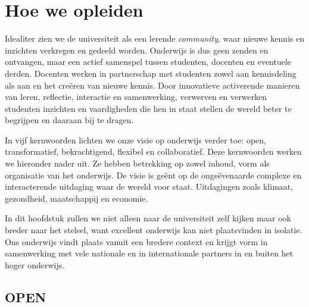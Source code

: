 \documentclass[smallauthor, chapterhaspagenum, nochapterinheader, pagenuminheader,  bigchapnum,medium2, tocpages,  garamond, titleinheader]{jote-book}
\begin{document}
	\section{Hoe we opleiden}



	Idealiter zien we de universiteit als een lerende \emph{community}, waar nieuwe kennis en inzichten verkregen en gedeeld worden. Onderwijs is dus geen zenden en ontvangen, maar een actief samenspel tussen studenten, docenten en eventuele derden. Docenten werken in partnerschap met studenten zowel aan kennisdeling als aan en het creëren van nieuwe kennis. Door innovatieve activerende manieren van leren, reflectie, interactie en samenwerking, verwerven en verwerken studenten inzichten en vaardigheden die hen in staat stellen de wereld beter te begrijpen en daaraan bij te dragen.



	In vijf kernwoorden lichten we onze visie op onderwijs verder toe: open, transformatief, bekrachtigend, flexibel en collaboratief. Deze kernwoorden werken we hieronder nader uit. Ze hebben betrekking op zowel inhoud, vorm als organisatie van het onderwijs. De visie is geënt op de ongeëvenaarde complexe en interacterende uitdaging waar de wereld voor staat. Uitdagingen zoals klimaat, gezondheid, maatschappij en economie.



	In dit hoofdstuk zullen we niet alleen naar de universiteit zelf kijken maar ook breder naar het stelsel, want excellent onderwijs kan niet plaatsvinden in isolatie. Ons onderwijs vindt plaats vanuit een bredere context en krijgt vorm in samenwerking met vele nationale en in internationale partners in en buiten het hoger onderwijs.



	\subsection{OPEN}
\end{document}

